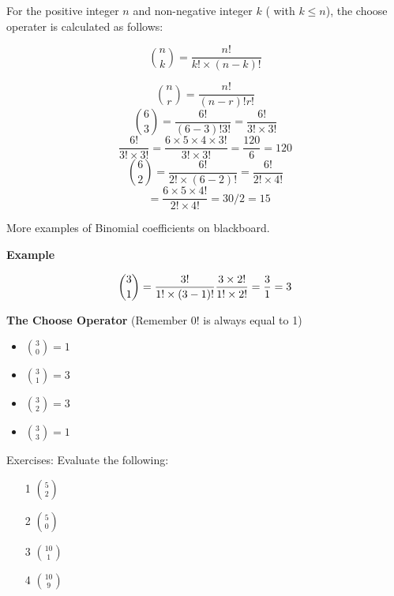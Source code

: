 \documentclass[]{report}
\begin{document}
For the positive integer $n$ and non-negative integer $k$ ( with $k\leq n$), the choose operater is calculated as follows:

\[ {n \choose k} = \frac{n!}{k! \times (n-k)!} \]

\begin{framed}
	
\[ {n \choose r} = \frac{n!}{(n-r)! r!} \]
\smallskip
\[ {6 \choose 3} = \frac{6!}{(6-3)! 3!} = \frac{6!}{3! \times 3!}\]
\smallskip
\[ \frac{6!}{3! \times 3!} = \frac{6 \times 5 \times 4 \times 3!}{3! \times 3!} = \frac{120}{6} = 120\]
\smallskip
\[ {6 \choose 2} = \frac{6!}{2! \times (6-2)!} = \frac{6!}{2! \times 4!}  \]\[\mbox{   } = \frac{6 \times 5 \times 4!}{2! \times 4!} 
= 30/2 =15 \]

\end{framed}


More examples of Binomial coefficients on blackboard.



\noindent \textbf{Example}

\[{3\choose 1}  = { 3! \over 1! \times(3-1)!} { 3 \times 2! \over 1! \times 2!} = \frac{3}{1} = 3 \]



\textbf{The Choose Operator}
(Remember $0!$  is always equal to 1)
\begin{multicol}{2}
\begin{itemize}
	\item ${3 \choose 0} = 1$
	\item ${3 \choose 1} = 3$
	\item ${3 \choose 2} = 3$
	\item ${3 \choose 3} = 1$
\end{itemize}
\end{multicol}



Exercises: Evaluate the following:

\begin{itemize}
	\item[1] ${5 \choose 2}$
	\item[2] ${5 \choose 0}$
	\item[3] ${10 \choose 1}$
	\item[4] ${10 \choose 9}$
\end{itemize}
\end{document}
